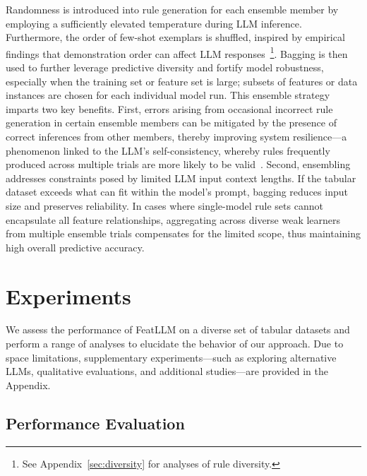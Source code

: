 Randomness is introduced into rule generation for each ensemble member by employing a sufficiently elevated temperature during LLM inference. Furthermore, the order of few-shot exemplars is shuffled, inspired by empirical findings that demonstration order can affect LLM responses~\cite{lu2022fantastically}\footnote{See Appendix~\ref{sec:diversity} for analyses of rule diversity.}. Bagging is then used to further leverage predictive diversity and fortify model robustness, especially when the training set or feature set is large; subsets of features or data instances are chosen for each individual model run. This ensemble strategy imparts two key benefits. First, errors arising from occasional incorrect rule generation in certain ensemble members can be mitigated by the presence of correct inferences from other members, thereby improving system resilience—a phenomenon linked to the LLM's self-consistency, whereby rules frequently produced across multiple trials are more likely to be valid~\cite{wang2022self}. Second, ensembling addresses constraints posed by limited LLM input context lengths. If the tabular dataset exceeds what can fit within the model's prompt, bagging reduces input size and preserves reliability. In cases where single-model rule sets cannot encapsulate all feature relationships, aggregating across diverse weak learners from multiple ensemble trials compensates for the limited scope, thus maintaining high overall predictive accuracy.

\section{Experiments}
We assess the performance of \textsf{FeatLLM} on a diverse set of tabular datasets and perform a range of analyses to elucidate the behavior of our approach. Due to space limitations, supplementary experiments—such as exploring alternative LLMs, qualitative evaluations, and additional studies—are provided in the Appendix.

\subsection{Performance Evaluation}
